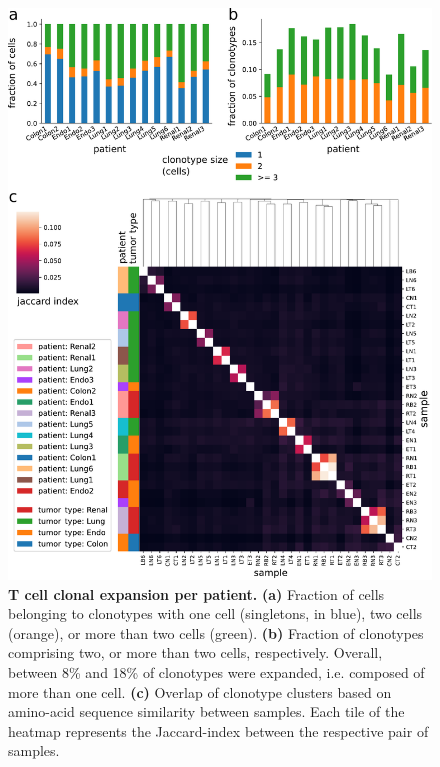 \documentclass{article}
\begin{document}
\newpage
\begin{figure}[H]
  \centering
  \includegraphics[width=6.5in]{../figures/clonal_expansion.pdf}
  \caption{\textbf{T cell clonal expansion per patient.} \textbf{(a)} Fraction of cells belonging to clonotypes with one cell (singletons, in blue), two cells (orange), or more than two cells (green). \textbf{(b)} Fraction of clonotypes comprising two, or more than two cells, respectively. Overall, between 8\% and 18\% of clonotypes were expanded, i.e. composed of more than one cell. \textbf{(c)} Overlap of clonotype clusters based on amino-acid sequence similarity  between samples. Each tile of the heatmap represents the Jaccard-index between the respective pair of samples. }
\end{figure}
\end{document}

